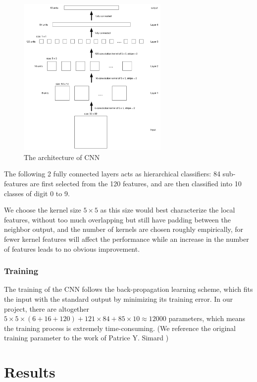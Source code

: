 \documentclass[12pt]{article}
\begin{document}
\begin{figure}[tbp]
	\centering
	\includegraphics[width = 0.65\textwidth]{cnn}		
	\caption{The architecture of CNN}
	\label{fig:arch}
\end{figure}

The following 2 fully connected layers acts as hierarchical classifiers: 84 sub-features are first selected from the 120 features, and are then classified into 10 classes of digit 0 to 9.

We choose the kernel size  $5\times 5$ as this size would best characterize the local features, without too much overlapping but still have padding between the neighbor output, and the number of kernels are chosen roughly empirically, for fewer kernel features will affect the performance while  an increase in the number of features leads to no obvious improvement. 


\subsubsection{Training}

The training of the CNN follows the back-propagation learning scheme\cite{lecun1989backpropagation}, which fits the input with the standard output by minimizing its training error.
In our project, there are altogether $5\times 5\times(6+16+120)+121\times84+85\times10 \approx 12000$ parameters, which means the training process is extremely time-consuming. 
(We reference the original training parameter to the work of Patrice Y. Simard \cite{simard2003best})


\section{Results}
\label{sec:res}
\end{document}
